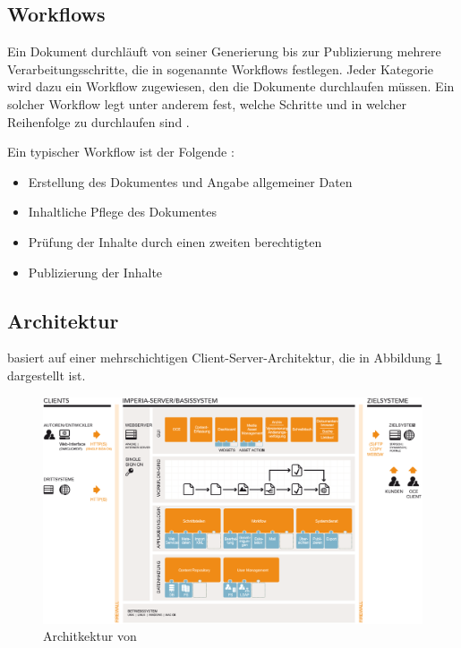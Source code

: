     \subsection{Workflows}
        Ein Dokument durchläuft von seiner Generierung bis zur
        Publizierung mehrere Verarbeitungsschritte,
        die in {\imperia} sogenannte Workflows festlegen.
        Jeder Kategorie wird dazu ein Workflow zugewiesen,
        den die Dokumente durchlaufen müssen.
        Ein solcher Workflow legt unter anderem fest,
        welche Schritte und in welcher Reihenfolge
        zu durchlaufen sind
        \cite[Kapitel 1.1.5]{imperia:ecmd}.

        Ein typischer Workflow ist der Folgende
        \cite[Kapitel 1.1]{imperia:ecmd}:

        \begin{itemize}
            \item Erstellung des Dokumentes und Angabe allgemeiner Daten
            \item Inhaltliche Pflege des Dokumentes
            \item Prüfung der Inhalte durch einen zweiten berechtigten \editor
            \item Publizierung der Inhalte
        \end{itemize}

    \subsection{Architektur}
        \label{section:imperiaArch}
        {\imperia} basiert auf einer mehrschichtigen Client-Server-Architektur,
        die in Abbildung \ref{image:imperiaArchitektur} dargestellt ist.

        \begin{figure}[htb]
            \centering
            \includegraphics[width=\textwidth]{../resources/imperia/architektur.png}
            \caption{Architkektur von {\imperia} \cite{imperia:ecmd}}
            \label{image:imperiaArchitektur}
        \end{figure}

